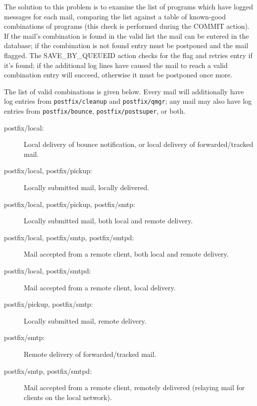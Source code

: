 \documentclass[a4paper,12pt,draft]{article}
\begin{document}
The solution to this problem is to examine the list of programs which have
logged messages for each mail, comparing the list against a table of
known-good combinations of programs (this check is performed during the
COMMIT action).  If the mail's combination is found in the valid list the
mail can be entered in the database; if the combination is not found entry
must be postponed and the mail flagged.  The SAVE\_BY\_QUEUEID action
checks for the flag and retries entry if it's found; if the additional log
lines have caused the mail to reach a valid combination entry will succeed,
otherwise it must be postponed once more.

The list of valid combinations is given below.  Every mail will
additionally have log entries from \texttt{postfix/cleanup} and
\texttt{postfix/qmgr}; any mail may also have log entries from
\texttt{postfix/bounce}, \texttt{postfix/postsuper}, or both.

\begin{description}

    \item [postfix/local:] Local delivery of bounce notification, or local
        delivery of forwarded/tracked mail.

    \item [postfix/local, postfix/pickup:] Locally submitted mail, locally
        delivered.

    \item [postfix/local, postfix/pickup, postfix/smtp:] Locally submitted
        mail, \newline both local and remote delivery.

    \item [postfix/local, postfix/smtp, postfix/smtpd:] Mail accepted from
        a remote client, both local and remote delivery.

    \item [postfix/local, postfix/smtpd:] Mail accepted from a remote
        client, local delivery.

    \item [postfix/pickup, postfix/smtp:] Locally submitted mail, remote
        delivery.

    \item [postfix/smtp:] Remote delivery of forwarded/tracked mail.

    \item [postfix/smtp, postfix/smtpd:] Mail accepted from a remote
        client, remotely delivered (relaying mail for clients on the local
        network).

\end{description}
\end{document}

